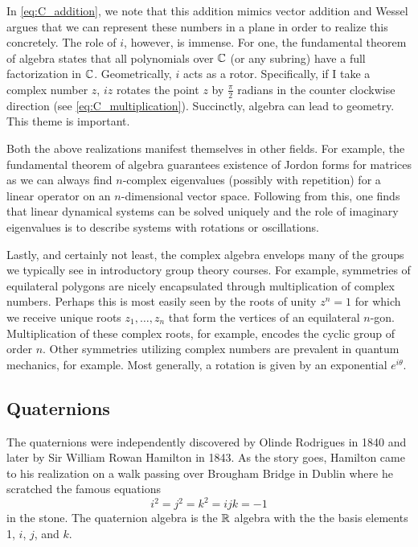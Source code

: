 \documentclass[12pt]{article}
\begin{document}
In \cref{eq:C_addition}, we note that this addition mimics vector addition and Wessel argues that we can represent these numbers in a plane in order to realize this concretely. The role of $i$, however, is immense. For one, the fundamental theorem of algebra states that all polynomials over $\mathbb{C}$ (or any subring) have a full factorization in $\mathbb{C}$. Geometrically, $i$ acts as a rotor. Specifically, if I take a complex number $z$, $iz$ rotates the point $z$ by $\frac{\pi}{2}$ radians in the counter clockwise direction (see \cref{eq:C_multiplication}). Succinctly, algebra can lead to geometry. This theme is important.

Both the above realizations manifest themselves in other fields. For example, the fundamental theorem of algebra guarantees existence of Jordon forms for matrices as we can always find $n$-complex eigenvalues (possibly with repetition) for a linear operator on an $n$-dimensional vector space. Following from this, one finds that linear dynamical systems can be solved uniquely and the role of imaginary eigenvalues is to describe systems with rotations or oscillations. 

Lastly, and certainly not least, the complex algebra envelops many of the groups we typically see in introductory group theory courses. For example, symmetries of equilateral polygons are nicely encapsulated through multiplication of complex numbers. Perhaps this is most easily seen by the roots of unity $z^n=1$ for which we receive unique roots $z_1,\dots,z_n$ that form the vertices of an equilateral $n$-gon. Multiplication of these complex roots, for example, encodes the cyclic group of order $n$. Other symmetries utilizing complex numbers are prevalent in quantum mechanics, for example. Most generally, a rotation is given by an exponential $e^{i\theta}$.

\subsection{Quaternions}

The quaternions were independently discovered by Olinde Rodrigues in 1840 and later by Sir William Rowan Hamilton in 1843. As the story goes, Hamilton came to his realization on a walk passing over Brougham Bridge in Dublin where he scratched the famous equations
\begin{equation}
\label{eq:hamiltons}
i^2=j^2=k^2=ijk=-1
\end{equation}
in the stone. The quaternion algebra is the $\mathbb{R}$ algebra with the the basis elements 1, $i$, $j$, and $k$.
\end{document}
